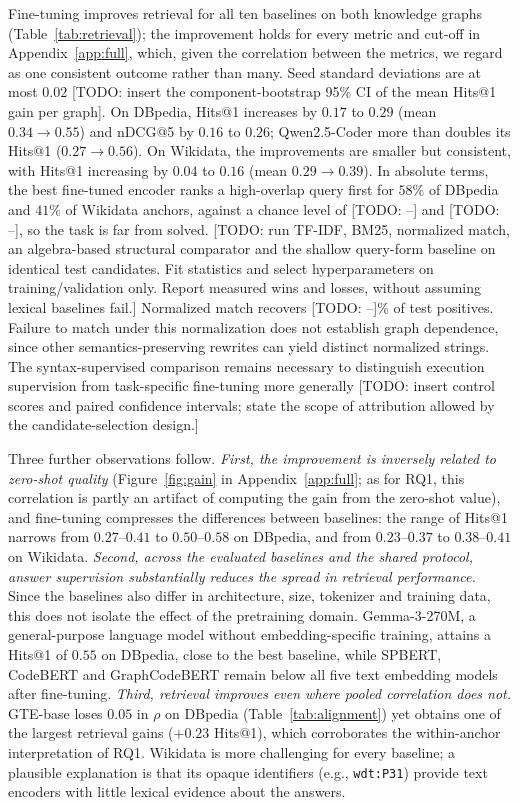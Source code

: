 \documentclass[runningheads]{llncs}
\newcommand{\hp}[1]{{\color{red!75!black}#1}}
\begin{document}
Fine-tuning improves retrieval for all ten baselines on both knowledge graphs
(Table~\ref{tab:retrieval}); the improvement holds for every metric and
cut-off in Appendix~\ref{app:full}, which, given the correlation between the
metrics, we regard as one consistent outcome rather than many. Seed standard
deviations are at most $0.02$ \hp{[TODO: insert the component-bootstrap 95\%
CI of the mean Hits@1 gain per graph]}. On DBpedia,
Hits@1 increases by $0.17$ to $0.29$ (mean $0.34 \rightarrow 0.55$) and nDCG@5
by $0.16$ to $0.26$; Qwen2.5-Coder more than doubles its Hits@1
($0.27 \rightarrow 0.56$). On Wikidata, the improvements are smaller but
consistent, with Hits@1 increasing by $0.04$ to $0.16$ (mean
$0.29 \rightarrow 0.39$). In absolute terms, the best fine-tuned encoder ranks
a high-overlap query first for $58\%$ of DBpedia and $41\%$ of Wikidata
anchors, against a chance level of \hp{[TODO: --]} and \hp{[TODO: --]}, so the
task is far from solved. \hp{[TODO: run TF-IDF, BM25, normalized match, an algebra-based structural
comparator and the shallow query-form baseline on identical test candidates.
Fit statistics and select hyperparameters on training/validation only.
Report measured wins and losses, without assuming lexical baselines fail.]}
Normalized match recovers \hp{[TODO: --]}\% of test positives. Failure to match
under this normalization does not establish graph dependence, since other
semantics-preserving rewrites can yield distinct normalized strings.
The syntax-supervised comparison remains necessary to distinguish execution
supervision from task-specific fine-tuning more generally
\hp{[TODO: insert control scores and paired confidence intervals; state the
scope of attribution allowed by the candidate-selection design.]}



Three further observations follow. \emph{First, the improvement is inversely
related to zero-shot quality} (Figure~\ref{fig:gain} in Appendix~\ref{app:full}; as for RQ1, this correlation is partly an artifact of
computing the gain from the zero-shot value), and fine-tuning compresses the
differences between baselines: the range of Hits@1 narrows from
$0.27$--$0.41$ to $0.50$--$0.58$ on DBpedia, and from $0.23$--$0.37$ to
$0.38$--$0.41$ on Wikidata. \emph{Second, across the evaluated baselines and the shared protocol,
answer supervision substantially reduces the spread in retrieval
performance.} Since the baselines also differ in architecture, size, tokenizer
and training data, this does not isolate the effect of the pretraining domain.
Gemma-3-270M, a general-purpose language model without
embedding-specific training, attains a Hits@1 of $0.55$ on DBpedia, close to
the best baseline, while SPBERT, CodeBERT and GraphCodeBERT remain below all
five text embedding models after fine-tuning. \emph{Third, retrieval improves
even where pooled correlation does not.} GTE-base loses $0.05$ in $\rho$ on
DBpedia (Table~\ref{tab:alignment}) yet obtains one of the largest retrieval
gains ($+0.23$ Hits@1), which corroborates the within-anchor interpretation of
RQ1. Wikidata is more challenging for every baseline; a plausible explanation
is that its opaque identifiers (e.g., \texttt{wdt:P31}) provide text encoders
with little lexical evidence about the answers.
\end{document}
